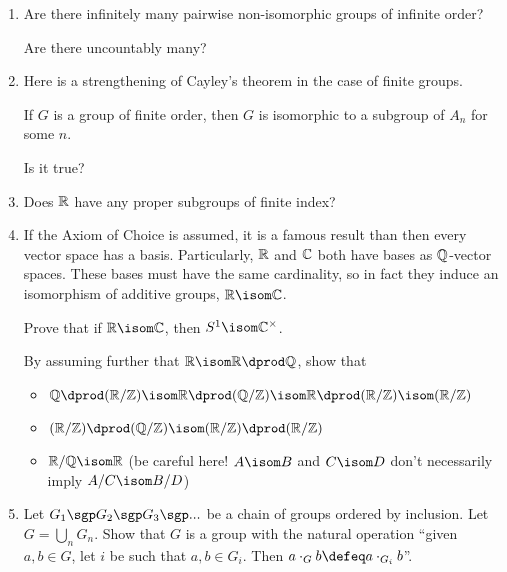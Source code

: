 \documentclass[a4paper,12pt]{article}
\begin{document}
\begin{enumerate}
  Which of the following groups are decomposable?
  \begin{multicols}{4}
   \begin{itemize}
    \item
     \(\Z\)
    \item
     \(\Q\)
    \item
     \(\C\)
    \item
     \(\Q^\times\)
    \item
     \(\R^\times\)
    \item
     \(\C^\times\)
    \item
     \(\Q_{>0}^\times\)
    \item
     \(\Q / \Z\)
   \end{itemize}
  \end{multicols}
 \item
  Are there infinitely many pairwise non-isomorphic groups of infinite order?

  Are there uncountably many?
 \item
  Here is a strengthening of Cayley's theorem in the case of finite groups.
  \begin{tcolorbox}
   If \(G\) is a group of finite order, then \(G\) is isomorphic to a subgroup
   of \(A_n\) for some \(n\).
  \end{tcolorbox}
  Is it true?
 \item
  Does \(\mathbb R\) have any proper subgroups of finite index?
 \item
  If the Axiom of Choice is assumed, it is a famous result than then every
  vector space has a basis. Particularly, \(\mathbb R\) and \(\C\) both have bases as
  \(\Q\)-vector spaces. These bases must have the same cardinality, so in fact
  they induce an isomorphism of additive groups, \(\R \isom \C\).

  Prove that if \(\R \isom \C\), then \(S^1 \isom \C^\times\).

  By assuming further that \(\R \isom \R \dprod \Q\), show that
  \begin{itemize}
   \item
    \(\Q \dprod (\R/\Z) \isom \R \dprod (\Q/\Z) \isom
      \R \dprod (\R/\Z) \isom (\R/\Z)\)
   \item
    \((\R/\Z) \dprod (\Q/\Z) \isom (\R/\Z) \dprod (\R/\Z)\)
   \item
    \(\R/\Q \isom \R\)
    (be careful here! \(A \isom B\) and \(C \isom D\) don't necessarily imply
    \(A/C \isom B/D\))
  \end{itemize}
 \item
  Let \(G_1 \sgp G_2 \sgp G_3 \sgp ...\) be a chain of groups ordered by
  inclusion. Let \(G = \bigcup_n G_n\). Show that \(G\) is a group with the
  natural operation ``given \(a, b \in G\), let \(i\) be such that
  \(a, b \in G_i\). Then \(a \cdot_G b \defeq a \cdot_{G_i} b\)''.


\end{enumerate}
\end{document}
